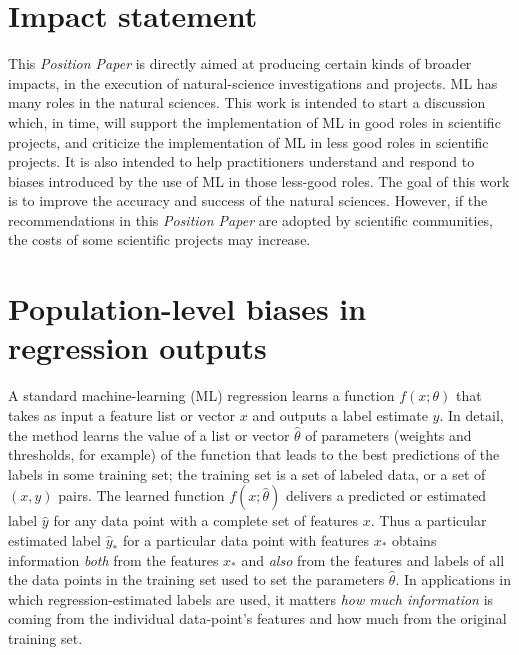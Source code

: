 \documentclass{article}
\newcommand{\documentname}{\textsl{Position Paper}}
\begin{document}
\section*{Impact statement}
This \documentname{} is directly aimed at producing certain kinds of broader impacts, in the execution of natural-science investigations and projects.
ML has many roles in the natural sciences.
This work is intended to start a discussion which, in time, will support the implementation of ML in good roles in scientific projects, and criticize the implementation of ML in less good roles in scientific projects.
It is also intended to help practitioners understand and respond to biases introduced by the use of ML in those less-good roles.
The goal of this work is to improve the accuracy and success of the natural sciences.
However, if the recommendations in this \documentname{} are adopted by scientific communities, the costs of some scientific projects may increase.




\clearpage\appendix
\section{Population-level biases in regression outputs}\label{app:toy}
A standard machine-learning (ML) regression learns a function $f(x;\theta)$ that takes as input a feature list or vector $x$ and outputs a label estimate $y$.
In detail, the method learns the value of a list or vector $\hat{\theta}$ of parameters (weights and thresholds, for example) of the function that leads to the best predictions of the labels in some training set; the training set is a set of labeled data, or a set of $(x, y)$ pairs.
The learned function $f(x;\hat{\theta})$ delivers a predicted or estimated label $\hat{y}$ for any data point with a complete set of features $x$.
Thus a particular estimated label $\hat{y}_\ast$ for a particular data point with features $x_\ast$ obtains information \emph{both} from the features $x_\ast$ and \emph{also} from the features and labels of all the data points in the training set used to set the parameters $\hat{\theta}$.
In applications in which regression-estimated labels are used, it matters \emph{how much information} is coming from the individual data-point's features and how much from the original training set.
\end{document}
